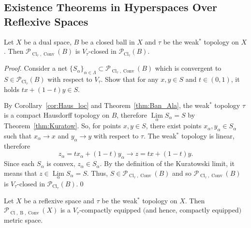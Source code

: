 \documentclass{svproc}
\def\Cl{\operatorname{Cl}}
\def\Conv{\operatorname{Conv}}
\def\B{\operatorname{B}}
\def\Lim{\operatorname{Lim}}
\begin{document}
\subsection{Existence Theorems in Hyperspaces Over Reflexive Spaces}\label{sec:hyp_ref}

\begin{lemma}\label{lem:hyp_closed}
Let $X$ be a dual space, $B$ be a closed ball in $X$ and $\tau$ be the weak$^*$ topology on $X$. Then $\mathcal{P}_{\Cl_{\tau}, \Conv}(B)$ is $V_{\tau}$-closed in $\mathcal{P}_{\Cl_{\tau}}(B)$.
\end{lemma}

\begin{proof}

Consider a net $\{S_{\alpha}\}_{\alpha\in \Lambda}\subset \mathcal{P}_{\Cl_{\tau}, \Conv}(B)$ which is convergent to $S\in \mathcal{P}_{\Cl_{\tau}}(B)$ with respect to $V_{\tau}$. Show that for any $x, y\in S$ and $t\in (0, 1)$, it holds $tx + (1-t)y \in S$. 

By Corollary~\ref{cor:Haus_loc} and Theorem~\ref{thm:Ban_Ala}, the weak$^*$ topology $\tau$ is a compact Hausdorff topology on $B$, therefore $\Lim\limits_{\alpha} S_{\alpha} = S$ by Theorem~\ref{thm:Kuratow}. So, for points $x, y\in S$, there exist points $x_{\alpha}, y_{\alpha}\in S_{\alpha}$ such that $x_{\alpha}\to x$ and $y_{\alpha}\to y$ with respect to $\tau$. The weak$^*$ topology is linear, therefore 
$$z_{\alpha} = tx_{\alpha} + (1-t)y_{\alpha} \to z = tx + (1-t)y.$$
Since each $S_{\alpha}$ is convex, $z_{\alpha}\in S_{\alpha}$. By the definition of the Kuratowski limit, it means that $z\in \Lim\limits_{\alpha} S_{\alpha} = S$. Thus, $S\in \mathcal{P}_{\Cl_{\tau}, \Conv}(B)$ and so $\mathcal{P}_{\Cl_{\tau}, \Conv}(B)$ is $V_{\tau}$-closed in $\mathcal{P}_{\Cl_{\tau}}(B)$.\qed

\end{proof}

\begin{theorem}\label{thm:conv_hyperspace}
Let $X$ be a reflexive space and $\tau$ be the weak$^*$ topology on $X$. Then $\mathcal{P}_{\Cl, \B, \Conv}(X)$ is a $V_{\tau}$-compactly equipped $($and hence, compactly equipped$)$ metric space.
\end{theorem}
\end{document}
